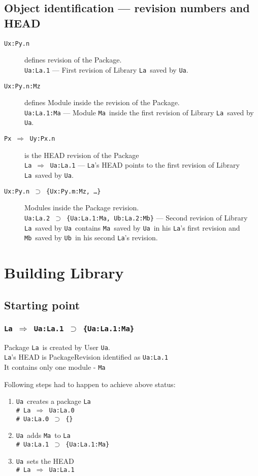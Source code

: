 \documentclass[10pt]{article}
\def\Ua{{\tt Ua}}
\def\Ub{{\tt Ub}}
\def\La{{\tt La}}
\def\Ma{{\tt Ma}}
\def\Mb{{\tt Mb}}
\def\headsto{${\Longrightarrow}$ }
\def\hto{\headsto}
\def\eq{${\supset}$ }
\begin{document}
	\subsection{Object identification --- revision numbers and HEAD}
	\begin{description}
		\item[{\tt Ux:Py.n}] defines revision of the Package.\\ 
			{\tt Ua:La.1} --- First revision of Library \La\ saved by \Ua.
		\item[{\tt Ux:Py.n:Mz}] defines Module inside the revision of the Package. \\ 
			{\tt Ua:La.1:Ma} --- Module \Ma\ inside the first revision of Library \La\ saved by \Ua.
		\item[{\tt Px \hto  Uy:Px.n}] is the HEAD revision of the Package\\ 
			{\tt La \hto  Ua:La.1} --- \La's HEAD points to the first revision of Library \La\ saved by \Ua.
		\item[{\tt Ux:Py.n \eq \{Ux:Py.m:Mz, \ldots\}}] Modules inside the Package revision.\\ 
			{\tt Ua:La.2 \eq \{Ua:La.1:Ma, Ub:La.2:Mb\}} --- Second revision of Library \La\ saved by \Ua\ contains \Ma\ saved by \Ua\ in his \La's first revision and \Mb\ saved by \Ub\ in his second \La's revision.
	\end{description}

\section{Building Library}

	\subsection{Starting point}

		\subsubsection*{{\tt La \hto  Ua:La.1 \eq \{Ua:La.1:Ma\}}}
			Package \La\ is created by User \Ua.\\
			\La's HEAD is PackageRevision identified as {\tt Ua:La.1}\\
			It contains only one module - \Ma
			
			\noindent Following steps had to happen to achieve above status:
			\begin{enumerate}
				\item{\Ua\ creates a package \La\\
				    {\tt \# La \hto  Ua:La.0} \\
				    {\tt \# Ua:La.0 \eq \{\}}
				}
				\item{\Ua\ adds \Ma\ to \La\\
					{\tt \# Ua:La.1 \eq \{Ua:La.1:Ma\}}
				}
				\item{\Ua\ sets the HEAD\\
					{\tt \# La \hto  Ua:La.1}
				}
			\end{enumerate}
			
\end{document}

